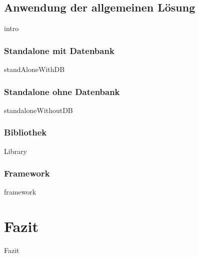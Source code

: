\documentclass{article}
\begin{document}
    \newpage
    \subsection{Anwendung der allgemeinen Lösung}
        {intro}
        
        \newpage
        \subsubsection{Standalone mit Datenbank}
            {standAloneWithDB}

        \newpage
        \subsubsection{Standalone ohne Datenbank}
            {standaloneWithoutDB}

        \newpage
        \subsubsection{Bibliothek}
            {Library}
        
        \newpage
        \subsubsection{Framework}
            {framework}
    
\section{Fazit}
    {Fazit}




\newpage
\printbibliography[heading = bibintoc, title = Literaturverzeichnis]    %

\nocite{MF_isHighQuilatySoftwareWorthTheCost}
\nocite{enterprisePatterns}
\nocite{cleanCode}
\nocite{CiCd}
\nocite{frameworkOnline1}

\nocite{frameworkOnline2}

\nocite{frameworkOnline3}
\nocite{unused}

\end{document}
